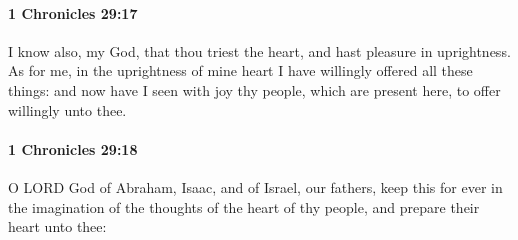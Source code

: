 		\paragraph{1 Chronicles 29:17} %
			\label{1CHRONICLES-29-17}

			I know also, my God, that thou triest the heart, and hast pleasure in uprightness. As for me, in the uprightness of mine heart I have willingly offered all these things: and now have I seen with joy thy people, which are present here, to offer willingly unto thee.


		\paragraph{1 Chronicles 29:18} %
			\label{1CHRONICLES-29-18}

			O LORD God of Abraham, Isaac, and of Israel, our fathers, keep this for ever in the imagination of the thoughts of the heart of thy people, and prepare their heart unto thee:

